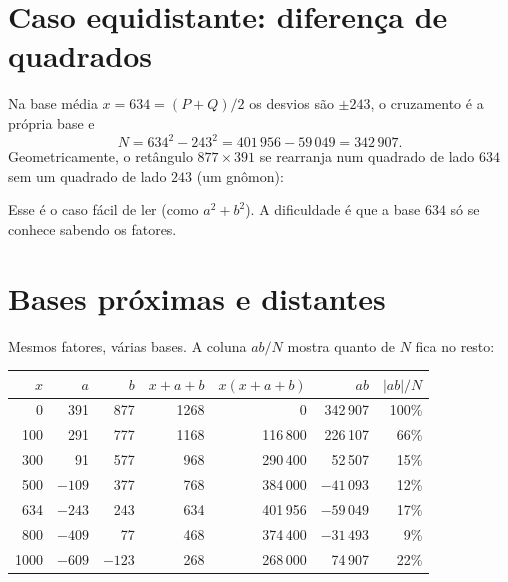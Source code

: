 \documentclass[11pt,a4paper]{article}
\newcommand{\N}{342\,907}
\begin{document}
\section{Caso equidistante: diferença de quadrados}

Na base média $x=634=(P+Q)/2$ os desvios são $\pm 243$, o cruzamento é a própria base e
\[
N = 634^2 - 243^2 = 401\,956 - 59\,049 = \N .
\]
Geometricamente, o retângulo $877\times 391$ se rearranja num quadrado de lado $634$ sem um quadrado de lado $243$ (um gnômon):

\begin{center}
\end{center}

Esse é o caso fácil de ler (como $a^2+b^2$). A dificuldade é que a base $634$ só se conhece sabendo os fatores.

\section{Bases próximas e distantes}

Mesmos fatores, várias bases. A coluna $ab/N$ mostra quanto de $N$ fica no resto:

\begin{center}
\begin{tabular}{rrrrrrr}
\toprule
$x$ & $a$ & $b$ & $x+a+b$ & $x(x+a+b)$ & $ab$ & $|ab|/N$ \\
\midrule
0    & 391  & 877  & 1268 & 0       & 342\,907 & 100\% \\
100  & 291  & 777  & 1168 & 116\,800 & 226\,107 & 66\% \\
300  & 91   & 577  & 968  & 290\,400 & 52\,507  & 15\% \\
500  & $-109$ & 377 & 768  & 384\,000 & $-41\,093$ & 12\% \\
634  & $-243$ & 243 & 634  & 401\,956 & $-59\,049$ & 17\% \\
800  & $-409$ & 77  & 468  & 374\,400 & $-31\,493$ & 9\% \\
1000 & $-609$ & $-123$ & 268 & 268\,000 & 74\,907 & 22\% \\
\bottomrule
\end{tabular}
\end{center}
\end{document}
